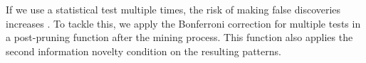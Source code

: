If we use a statistical test multiple times, the risk of making false discoveries increases \cite{webb2006}.
To tackle this, we apply the Bonferroni correction for multiple tests in a post-pruning function after the mining process.
This function also applies the second information novelty condition on the resulting patterns.
